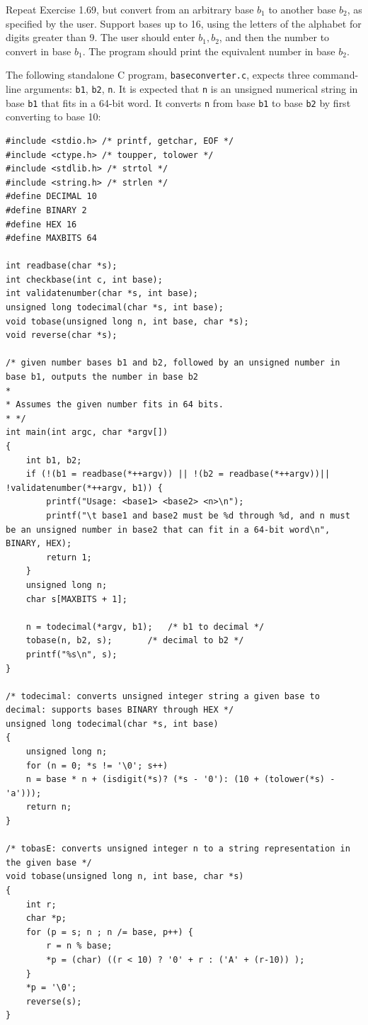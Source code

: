 \documentclass[12pt]{article}
\newenvironment{ex}[2][Exercise]{\begin{trivlist}
		\item[\hskip \labelsep {\bfseries #1}\hskip \labelsep {\bfseries #2.}]}{\end{trivlist}}
\newenvironment{sol}[1][Solution]{\begin{trivlist}
		\item[\hskip \labelsep {\bfseries #1:}]}{\end{trivlist}}
\begin{document}
\begin{ex}{1.70}
	Repeat Exercise 1.69, but convert from an arbitrary base $b_1$ to another base $b_2$, as specified by the user. Support bases up to 16, using the letters of the alphabet for digits greater than 9. The user should enter $b_1, b_2$, and then the number to convert in base $b_1$. The program should print the equivalent number in base $b_2$.
\end{ex}

\begin{sol}
	The following standalone C program, \texttt{baseconverter.c}, expects three command-line arguments: \texttt{b1}, \texttt{b2}, \texttt{n}. It is expected that \texttt{n} is an unsigned numerical string in base \texttt{b1} that fits in a 64-bit word. It converts \texttt{n} from base \texttt{b1} to base \texttt{b2} by first converting to base 10:
	
	\begin{lstlisting}
#include <stdio.h> /* printf, getchar, EOF */
#include <ctype.h> /* toupper, tolower */
#include <stdlib.h>	/* strtol */
#include <string.h> /* strlen */
#define DECIMAL 10
#define BINARY 2
#define HEX 16
#define MAXBITS 64

int readbase(char *s);
int checkbase(int c, int base);
int validatenumber(char *s, int base);
unsigned long todecimal(char *s, int base);
void tobase(unsigned long n, int base, char *s);
void reverse(char *s);

/* given number bases b1 and b2, followed by an unsigned number in base b1, outputs the number in base b2 
*
* Assumes the given number fits in 64 bits.
* */
int main(int argc, char *argv[])
{
	int b1, b2;
	if (!(b1 = readbase(*++argv)) || !(b2 = readbase(*++argv))|| !validatenumber(*++argv, b1)) {
		printf("Usage: <base1> <base2> <n>\n");
		printf("\t base1 and base2 must be %d through %d, and n must be an unsigned number in base2 that can fit in a 64-bit word\n", BINARY, HEX);
		return 1;
	}
	unsigned long n;
	char s[MAXBITS + 1];
	
	n = todecimal(*argv, b1);	/* b1 to decimal */
	tobase(n, b2, s);		/* decimal to b2 */
	printf("%s\n", s);
}

/* todecimal: converts unsigned integer string a given base to decimal: supports bases BINARY through HEX */
unsigned long todecimal(char *s, int base)
{
	unsigned long n;
	for (n = 0; *s != '\0'; s++)
	n = base * n + (isdigit(*s)? (*s - '0'): (10 + (tolower(*s) - 'a')));
	return n;
}

/* tobasE: converts unsigned integer n to a string representation in the given base */
void tobase(unsigned long n, int base, char *s)
{
	int r;
	char *p;
	for (p = s; n ; n /= base, p++) {
		r = n % base;
		*p = (char) ((r < 10) ? '0' + r : ('A' + (r-10)) );
	}
	*p = '\0';
	reverse(s);
}


\end{lstlisting}
\end{sol}
\end{document}
